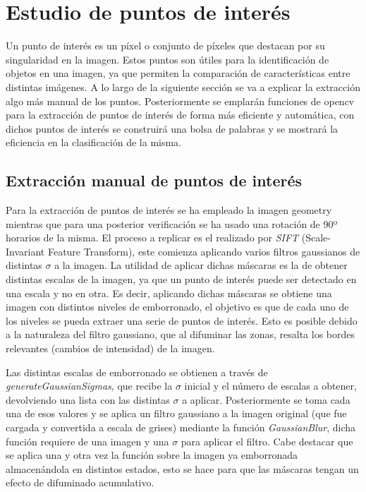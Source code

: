 \documentclass[a4paper,12pt]{article}
\begin{document}
{\newpage


\section{Estudio de puntos de interés}


\vspace{1cm}

Un punto de interés es un píxel o conjunto de píxeles que destacan por su singularidad en la imagen. Estos puntos son útiles para la identificación de objetos
en una imagen, ya que permiten la comparación de características entre distintas imágenes. A lo largo de la siguiente sección se va a explicar la 
extracción algo más manual de los puntos. Posteriormente se emplarán funciones de opencv para la extracción de puntos de interés de forma más eficiente y automática,
con dichos puntos de interés se construirá una bolsa de palabras y se mostrará la eficiencia en la clasificación de la misma.

\vspace{0.5cm}

\subsection{Extracción manual de puntos de interés} 

\vspace{0.5cm}

Para la extracción de puntos de interés se ha empleado la imagen geometry mientras que para una posterior verificación se ha usado una rotación de 90º horarios de la misma.
El proceso a replicar es el realizado por \textit{SIFT} (Scale-Invariant Feature Transform), este comienza aplicando varios filtros gaussianos de distintas $\sigma$ a la imagen.
La utilidad de aplicar dichas máscaras es la de obtener distintas escalas de la imagen, ya que un punto de interés puede ser detectado en una escala y no en otra. Es decir, aplicando
dichas máscaras se obtiene una imagen con distintos niveles de emborronado, el objetivo es que de cada uno de los niveles se pueda extraer una serie de puntos de interés. Esto es
posible debido a la naturaleza del filtro gaussiano, que al difuminar las zonas, resalta los bordes relevantes (cambios de intensidad) de la imagen.

\vspace{0.5cm}

Las distintas escalas de emborronado se obtienen a través de \textit{generateGaussianSigmas}, que recibe la $\sigma$ inicial y el número de escalas a obtener, devolviendo una lista
con las distintas $\sigma$ a aplicar. Posteriormente se toma cada una de esos valores y se aplica un filtro gaussiano a la imagen original (que fue cargada y convertida a escala de grises)
mediante la función \textit{GaussianBlur}, dicha función requiere de una imagen y una $\sigma$ para aplicar el filtro. Cabe destacar que se aplica una y otra vez la función sobre la imagen
ya emborronada almacenándola en distintos estados, esto se hace para que las máscaras tengan un efecto de difuminado acumulativo.

}
\end{document}
